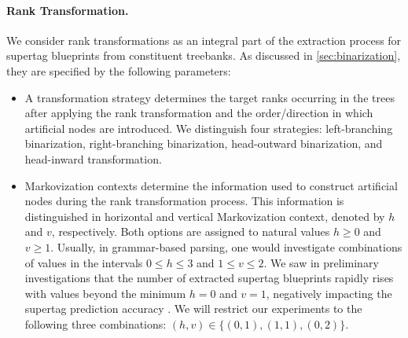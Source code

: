 \documentclass[../../document.tex]{subfiles}
\begin{document}
    \paragraph*{Rank Transformation.}
    We consider rank transformations as an integral part of the extraction process for supertag blueprints from constituent treebanks.
    As discussed in \cref{sec:binarization}, they are specified by the following parameters:
    \begin{itemize}
        \item A transformation strategy determines the target ranks occurring in the trees after applying the rank transformation and the order/direction in which artificial nodes are  introduced. We distinguish four strategies: left-branching binarization, right-branching binarization, head-outward binarization, and head-inward transformation.
        \item Markovization contexts determine the information used to construct artificial nodes during the rank transformation process. This information is distinguished in horizontal and vertical Markovization context, denoted by \(h\) and \(v\), respectively. Both options are assigned to natural values \(h \ge 0\) and \(v \ge 1\). Usually, in grammar-based parsing, one would investigate combinations of values in the intervals \(0 \le h \le 3\) and \(1 \le v \le 2\). We saw in preliminary investigations that the number of extracted supertag blueprints rapidly rises with values beyond the minimum \(h = 0\) and \(v = 1\), negatively impacting the supertag prediction accuracy \citep{Rup22}. We will restrict our experiments to the following three combinations: \((h, v) \in \{(0,1), (1,1), (0,2)\}\).
    \end{itemize}
\end{document}
